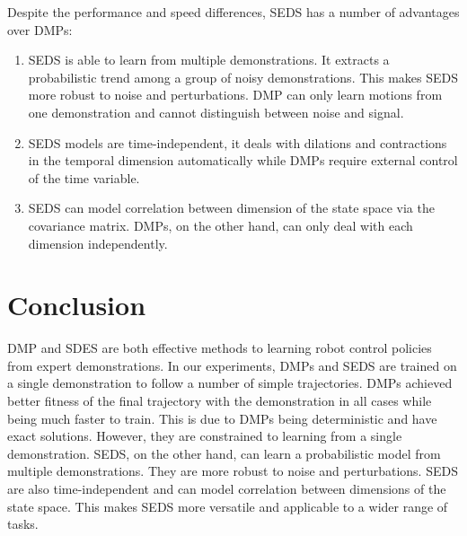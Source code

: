 \documentclass[conference]{IEEEtran}
\begin{document}
Despite the performance and speed differences, SEDS has a number of advantages over DMPs:
\begin{enumerate}
    \item SEDS is able to learn from multiple demonstrations. It extracts a probabilistic trend among a group of noisy demonstrations. This makes SEDS more robust to noise and perturbations. DMP can only learn motions from one demonstration and cannot distinguish between noise and signal.
    \item SEDS models are time-independent, it deals with dilations and contractions in the temporal dimension automatically while DMPs require external control of the time variable.
    \item SEDS can model correlation between dimension of the state space via the covariance matrix. DMPs, on the other hand, can only deal with each dimension independently.
\end{enumerate}

\section{Conclusion}

DMP and SDES are both effective methods to learning robot control policies from expert demonstrations. In our experiments, DMPs and SEDS are trained on a single demonstration to follow a number of simple trajectories. DMPs achieved better fitness of the final trajectory with the demonstration in all cases while being much faster to train. This is due to DMPs being deterministic and have exact solutions. However, they are constrained to learning from a single demonstration. SEDS, on the other hand, can learn a probabilistic model from multiple demonstrations. They are more robust to noise and perturbations. SEDS are also time-independent and can model correlation between dimensions of the state space. This makes SEDS more versatile and applicable to a wider range of tasks.



\end{document}
